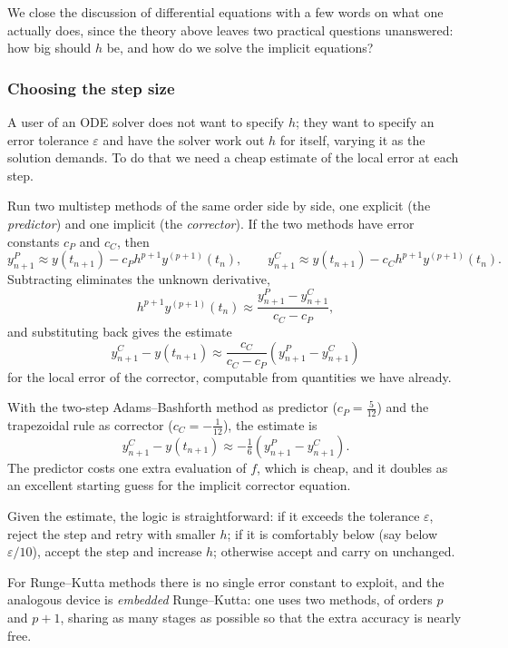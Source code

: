 We close the discussion of differential equations with a few words on what one actually does, since the theory above leaves two practical questions unanswered: how big should $h$ be, and how do we solve the implicit equations?

\subsubsection*{Choosing the step size}

A user of an ODE solver does not want to specify $h$; they want to specify an error tolerance $\varepsilon$ and have the solver work out $h$ for itself, varying it as the solution demands. To do that we need a cheap estimate of the local error at each step.

\begin{method}
  Run two multistep methods of the same order side by side, one explicit (the \emph{predictor}) and one implicit (the \emph{corrector}). If the two methods have error constants $c_P$ and $c_C$, then
  $$
  y^{P}_{n+1} \approx y(t_{n+1}) - c_P h^{p+1}y^{(p+1)}(t_n), \qquad y^{C}_{n+1} \approx y(t_{n+1}) - c_C h^{p+1}y^{(p+1)}(t_n).
  $$
  Subtracting eliminates the unknown derivative,
  $$
  h^{p+1}y^{(p+1)}(t_n) \approx \frac{y^P_{n+1} - y^C_{n+1}}{c_C - c_P},
  $$
  and substituting back gives the estimate
  $$
  y^C_{n+1} - y(t_{n+1}) \approx \frac{c_C}{c_C - c_P}\left(y^P_{n+1} - y^C_{n+1}\right)
  $$
  for the local error of the corrector, computable from quantities we have already.
\end{method}

\begin{example}
  With the two-step Adams--Bashforth method as predictor ($c_P = \tfrac{5}{12}$) and the trapezoidal rule as corrector ($c_C = -\tfrac1{12}$), the estimate is
  $$
  y^{C}_{n+1} - y(t_{n+1}) \approx -\tfrac16\left(y^{P}_{n+1} - y^{C}_{n+1}\right).
  $$
  The predictor costs one extra evaluation of $f$, which is cheap, and it doubles as an excellent starting guess for the implicit corrector equation.
\end{example}

Given the estimate, the logic is straightforward: if it exceeds the tolerance $\varepsilon$, reject the step and retry with smaller $h$; if it is comfortably below (say below $\varepsilon/10$), accept the step and increase $h$; otherwise accept and carry on unchanged.

For Runge--Kutta methods there is no single error constant to exploit, and the analogous device is \emph{embedded} Runge--Kutta: one uses two methods, of orders $p$ and $p+1$, sharing as many stages as possible so that the extra accuracy is nearly free.

